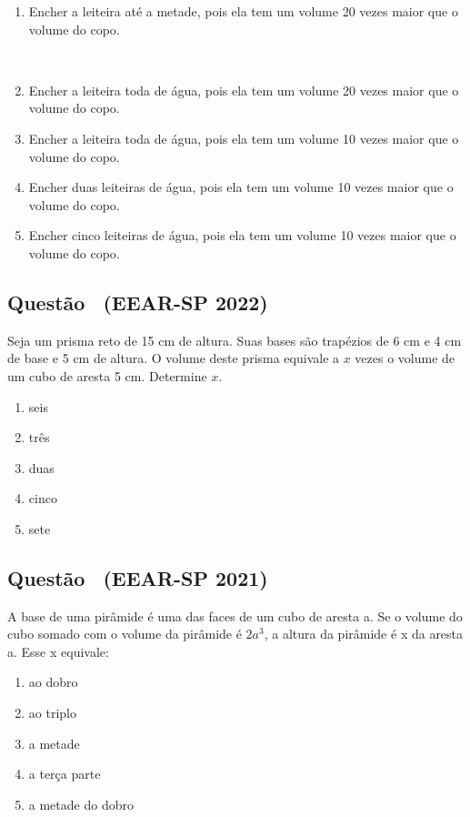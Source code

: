 \documentclass[12pt]{article}
\newif\ifmostravermelho
\newcommand{\vermelho}[1]{%
  \ifmostravermelho
    {\color{red}#1}%
  \else
    #1%
  \fi
}
\newcounter{questao}
\newcommand{\novaquestao}[1]{%
  \stepcounter{questao}%
  \subsection*{Questão \thequestao\ (#1)}%
}
\begin{document}
\begin{multicols}{2}
            \begin{enumerate}[label=(\alph*), noitemsep]
                \item \vermelho{Encher a leiteira até a metade, pois ela tem um volume 20 vezes maior que o volume do copo.} \\ %
                \item Encher a leiteira toda de água, pois ela tem um volume 20 vezes maior que o volume do copo. \\
                \item Encher a leiteira toda de água, pois ela tem um volume 10 vezes maior que o volume do copo. \\
                \item Encher duas leiteiras de água, pois ela tem um volume 10 vezes maior que o volume do copo. \\
                \item Encher cinco leiteiras de água, pois ela tem um volume 10 vezes maior que o volume do copo. 
            \end{enumerate}
        

        \novaquestao{EEAR-SP 2022}
            Seja um prisma reto de 15 cm de altura. Suas bases são trapézios de 6 cm e 4 cm de base e 5 cm de altura. O volume deste prisma equivale a $ x $ vezes o volume de um cubo de aresta 5 cm. Determine $x$.
        
            \begin{enumerate}[label=(\Alph*), noitemsep]
                \item seis
                \item \vermelho{três} %
                \item duas
                \item cinco
                \item sete \\
            \end{enumerate}

        \novaquestao{EEAR-SP 2021}
            A base de uma pirâmide é uma das faces de um cubo de aresta a. Se o volume do cubo somado com o volume da pirâmide é $2a^{3}$, a altura da pirâmide é x da aresta a. Esse x equivale:
        
            \begin{enumerate}[label=(\Alph*), noitemsep]
                \item ao dobro
                \item \vermelho{ao triplo} %
                \item a metade 
                \item a terça parte
                \item a metade do dobro
            \end{enumerate}


\end{multicols}
\end{document}
